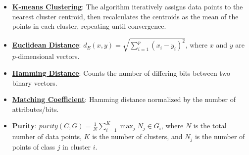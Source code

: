 \documentclass{article}%
\begin{document}
\begin{itemize}[leftmargin=*]%
\item \href{https://purdue.brightspace.com/d2l/common/assets/pdfjs-d2l-dist/1.0.14-legacy/web/viewer.html?file=%2Fcontent%2Fenforced%2F1095467-wl.202510.CS.24300.001%2F12L2-distance-clusters.pdf%3Fou%3D1095467&lang=en-us&container=d2l-fileviewer-rendered-pdf&fullscreen=d2l-fileviewer-rendered-pdf-dialog&height=667#page=22}{\textbf{K{-}means Clustering}}: The algorithm iteratively assigns data points to the nearest cluster centroid, then recalculates the centroids as the mean of the points in each cluster, repeating until convergence.%
\item \href{https://purdue.brightspace.com/d2l/common/assets/pdfjs-d2l-dist/1.0.14-legacy/web/viewer.html?file=%2Fcontent%2Fenforced%2F1095467-wl.202510.CS.24300.001%2F12L2-distance-clusters.pdf%3Fou%3D1095467&lang=en-us&container=d2l-fileviewer-rendered-pdf&fullscreen=d2l-fileviewer-rendered-pdf-dialog&height=667#page=17}{\textbf{Euclidean Distance}}: $d_E(x, y) = \sqrt{\sum_{i=1}^{p} (x_i - y_i)^2}$, where $x$ and $y$ are $p$-dimensional vectors.%
\item \href{https://purdue.brightspace.com/d2l/common/assets/pdfjs-d2l-dist/1.0.14-legacy/web/viewer.html?file=%2Fcontent%2Fenforced%2F1095467-wl.202510.CS.24300.001%2F12L2-distance-clusters.pdf%3Fou%3D1095467&lang=en-us&container=d2l-fileviewer-rendered-pdf&fullscreen=d2l-fileviewer-rendered-pdf-dialog&height=667#page=19}{\textbf{Hamming Distance}}: Counts the number of differing bits between two binary vectors.%
\item \href{https://purdue.brightspace.com/d2l/common/assets/pdfjs-d2l-dist/1.0.14-legacy/web/viewer.html?file=%2Fcontent%2Fenforced%2F1095467-wl.202510.CS.24300.001%2F12L2-distance-clusters.pdf%3Fou%3D1095467&lang=en-us&container=d2l-fileviewer-rendered-pdf&fullscreen=d2l-fileviewer-rendered-pdf-dialog&height=667#page=19}{\textbf{Matching Coefficient}}: Hamming distance normalized by the number of attributes/bits.%
\item \href{https://purdue.brightspace.com/d2l/common/assets/pdfjs-d2l-dist/1.0.14-legacy/web/viewer.html?file=%2Fcontent%2Fenforced%2F1095467-wl.202510.CS.24300.001%2F12L2-distance-clusters.pdf%3Fou%3D1095467&lang=en-us&container=d2l-fileviewer-rendered-pdf&fullscreen=d2l-fileviewer-rendered-pdf-dialog&height=667#page=44}{\textbf{Purity}}: $purity(C, G) = \frac{1}{N} \sum_{i=1}^{K} \max_{j} N_j \in G_i$, where $N$ is the total number of data points, $K$ is the number of clusters, and $N_j$ is the number of points of class $j$ in cluster $i$.%
\end{itemize}%
\end{document}
